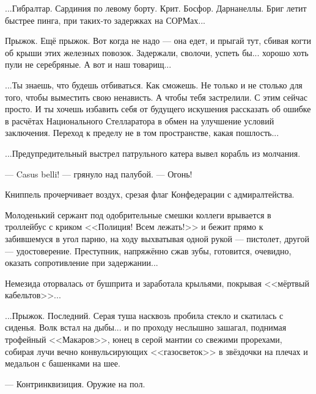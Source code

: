 \emptypar

...Гибралтар. Сардиния по левому борту. Крит. Босфор. Дарнанеллы. Бриг летит быстрее пинга, при таких-то задержках на СОРМах...

\emptypar

Прыжок. Ещё прыжок. Вот когда не надо --- она едет, и прыгай тут, сбивая когти об крыши этих железных повозок.
Задержали, сволочи, успеть бы... хорошо хоть пули не серебряные. А вот и наш товарищ...

\emptypar

...Ты знаешь, что будешь отбиваться. Как сможешь. Не только и не столько для того, чтобы выместить свою ненависть.
А чтобы тебя застрелили. С этим сейчас просто.
И ты хочешь избавить себя от будущего искушения рассказать об ошибке в расчётах Национального Стелларатора
в обмен на улучшение условий заключения. Переход к пределу не в том пространстве, какая пошлость...

\emptypar

...Предупредительный выстрел патрульного катера вывел корабль из молчания.

--- Casus belli! --- грянуло над палубой. --- Огонь!

Книппель прочерчивает воздух, срезая флаг Конфедерации с адмиралтейства.

\emptypar

Молоденький сержант под одобрительные смешки коллеги врывается в троллейбус с криком <<Полиция! Всем лежать!>>
и бежит прямо к забившемуся в угол парню, на ходу выхватывая одной рукой --- пистолет, другой --- удостоверение.
Преступник, напряжённо сжав зубы, готовится, очевидно, оказать сопротивление при задержании...

\emptypar

Немезида оторвалась от бушприта и заработала крыльями, покрывая <<мёртвый кабельтов>>...

\emptypar

...Прыжок. Последний. Серая туша насквозь пробила стекло и скатилась с сиденья.
Волк встал на дыбы... и по проходу неслышно зашагал, поднимая трофейный <<Макаров>>,
юнец в серой мантии со свежими прорехами, собирая лучи вечно конвульсирующих <<газосветок>>
в звёздочки на плечах и медальон с башенками на шее.

--- Контринквизиция. Оружие на пол.



